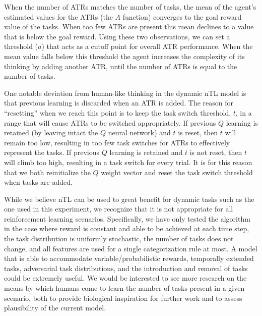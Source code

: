 \documentclass[10pt,letterpaper]{article}
\begin{document}
When the number of ATRs matches the number of tasks, the mean of the agent's estimated values for the ATRs (the $ A $ function) converges to the goal reward value of the tasks. When too few ATRs are present this mean declines to a value that is below the goal reward. Using these two observations, we can set a threshold ($a$) that acts as a cutoff point for overall ATR performance. When the mean value falls below this threshold the agent increases the complexity of its thinking by adding another ATR, until the number of ATRs is equal to the number of tasks.

One notable deviation from human-like thinking in the dynamic nTL model is that previous learning is discarded when an ATR is added. The reason for ``resetting'' when we reach this point is to keep the task switch threshold, $t$, in a range that will cause ATRs to be switched appropriately. If previous $Q$ learning is retained (by leaving intact the $Q$ neural network) and $t$ is reset, then $t$ will remain too low, resulting in too few task switches for ATRs to effectively represent the tasks. If previous $Q$ learning is retained and $t$ is not reset, then $t$ will climb too high, resulting in a task switch for every trial. It is for this reason that we both reinitialize the $Q$ weight vector and reset the task switch threshold when tasks are added.

While we believe nTL can be used to great benefit for dynamic tasks such as the one used in this experiment, we recognize that it is not appropriate for all reinforcement learning scenarios. Specifically, we have only tested the algorithm in the case where reward is constant and able to be achieved at each time step, the task distribution is uniformly stochastic, the number of tasks does not change, and all features are used for a single categorization rule at most. A model that is able to accommodate variable/probabilistic rewards, temporally extended tasks, adversarial task distributions, and the introduction and removal of tasks could be extremely useful. We would be interested to see more research on the means by which humans come to learn the number of tasks present in a given scenario, both to provide biological inspiration for further work and to assess plausibility of the current model.

\end{document}
